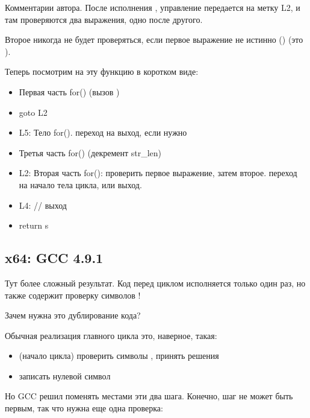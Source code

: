 

Комментарии автора.
После исполнения \strlen{}, управление передается на метку L2,
и там проверяются два выражения, одно после другого.

Второе никогда не будет проверяться, если первое выражение не истинно ()
(это ).

Теперь посмотрим на эту функцию в коротком виде:

\begin{itemize}
\item Первая часть for() (вызов \strlen{})
\item goto L2
\item L5: Тело for(). переход на выход, если нужно
\item Третья часть for() (декремент str\_len)
\item L2: Вторая часть for(): проверить первое выражение, затем второе. 
переход на начало тела цикла, или выход.

\item L4: // выход
\item return s
\end{itemize}

\subsection{x64: \Optimizing GCC 4.9.1}
\label{string_trim_GCC_x64_O3}



Тут более сложный результат.
Код перед циклом исполняется только один раз, но также содержит проверку символов \CRLF{}!

Зачем нужна это дублирование кода?

Обычная реализация главного цикла это, наверное, такая:

\begin{itemize}
\item (начало цикла) проверить символы \CRLF{}, принять решения

\item записать нулевой символ
\end{itemize}

Но GCC решил поменять местами эти два шага. 
Конечно, шаг  не может быть первым, так что нужна еще одна
проверка:


